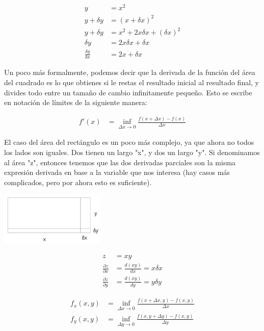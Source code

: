 \documentclass{article}
\begin{document}
	\begin{align*}
		y &= x^2 \\
		y + \delta y &= (x + \delta x) ^ 2 \\
		y + \delta y &= x^2 + 2x\delta x + (\delta x)^2 \\
		\delta y &= 2x\delta x + \delta x \\
		\frac{\delta y}{\delta x} &= 2x + \delta x
	\end{align*}

Un poco más formalmente, podemos decir que la derivada de la función del área del cuadrado es lo que obtienes si le restas el resultado inicial al resultado final, y divides todo entre un tamaño de cambio infinitamente pequeño. Esto se escribe en notación de límites de la siguiente manera: 

	\begin{align*}
		f'(x) &= \inf_{\Delta x \to 0}
			\frac{f(x + \Delta x) - f(x)}{\Delta x}
	\end{align*}

\newpage

El caso del área del rectángulo es un poco más complejo, ya que ahora no todos los lados son iguales. Dos tienen un largo "x", y dos un largo "y". Si denominamos al área "z", entonces tenemos que las dos derivadas parciales son la misma expresión derivada en base a la variable que nos interesa (hay casos más complicados, pero por ahora esto es suficiente). \\

	\begin{center}
		\includegraphics[keepaspectratio=true, width=5cm]{deriv_area_rectangle}
	\end{center}

	\begin{align*}
		z &= xy \\
		\frac{\partial z}{\partial x} &= \frac{d(xy)}{dx} = x\delta x \\
		\frac{\partial z}{\partial y} &= \frac{d(xy)}{dy} = y\delta y
	\end{align*}
	
	\begin{align*}
		f_x(x, y) &= \inf_{\Delta x \to 0}
			\frac{f(x+\Delta x, y) - f(x, y)}{\Delta x} \\
		f_y(x, y) &= \inf_{\Delta y \to 0}
			\frac{f(x, y+\Delta y) - f(x, y)}{\Delta y} \\
	\end{align*}
	
\end{document}
